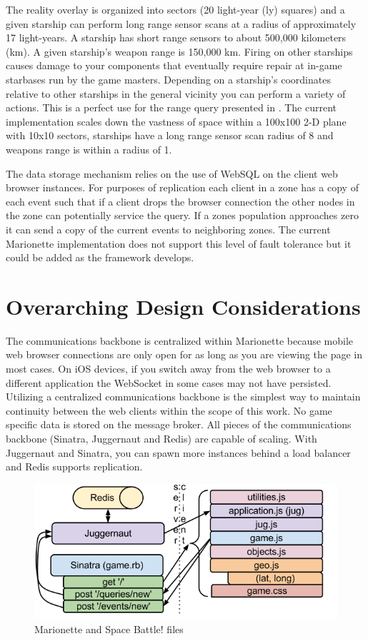 \documentclass[12pt]{report}	%
\theoremstyle{definition}
\theoremstyle{remark}
\begin{document}
The reality overlay is organized into sectors (20 light-year (ly)
squares) and a given starship can perform long range sensor scans at a
radius of approximately 17 light-years. A starship has short range
sensors to about 500,000 kilometers (km). A given starship's weapon
range is 150,000 km. Firing on other starships causes damage to your
components that eventually require repair at in-game starbases run by
the game masters. Depending on a starship's coordinates relative to
other starships in the general vicinity you can perform a variety of
actions. This is a perfect use for the range query presented in
\cite{zio2011p2p}. The current implementation scales
down the vastness of space within a 100x100 2-D plane with 10x10
sectors, starships have a long range sensor scan radius of 8 and weapons
range is within a radius of 1.

The data storage mechanism relies on the use of WebSQL on the client web
browser instances. For purposes of replication each client in a zone has
a copy of each event such that if a client drops the browser connection
the other nodes in the zone can potentially service the query. If a
zones population approaches zero it can send a copy of the current
events to neighboring zones. The current Marionette implementation does
not support this level of fault tolerance but it could be added as the
framework develops.

\chapter{Overarching Design Considerations}

The communications backbone is centralized within Marionette because
mobile web browser connections are only open for as long as you are
viewing the page in most cases. On iOS devices, if you switch away from
the web browser to a different application the WebSocket in some cases
may not have persisted. Utilizing a centralized communications backbone
is the simplest way to maintain continuity between the web clients
within the scope of this work. No game specific data is stored on the
message broker. All pieces of the communications backbone (Sinatra,
Juggernaut and Redis) are capable of scaling. With Juggernaut and
Sinatra, you can spawn more instances behind a load balancer and Redis
supports replication.

\begin{figure}[h!]
\centering
\includegraphics[scale=0.6]{3.png}
\caption{Marionette and Space Battle! files}
\label{files}
\end{figure}
\end{document}
